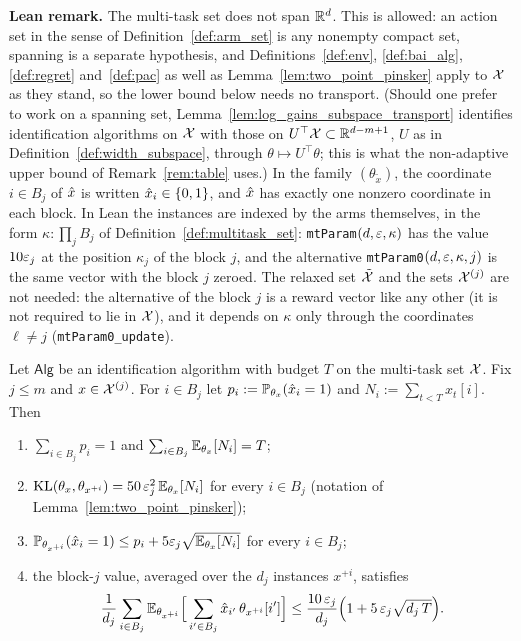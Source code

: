 \textbf{Lean remark.} The multi-task set does not span $\mathbb{R}^d$. This is allowed: an action
set in the sense of Definition~\ref{def:arm_set} is any nonempty compact set, spanning is a
separate hypothesis, and Definitions~\ref{def:env}, \ref{def:bai_alg}, \ref{def:regret}
and~\ref{def:pac} as well as Lemma~\ref{lem:two_point_pinsker} apply to $\mathcal{X}$ as they stand,
so the lower bound below needs no transport. (Should one prefer to work on a spanning set,
Lemma~\ref{lem:log_gains_subspace_transport} identifies identification algorithms on $\mathcal{X}$
with those on $U^\top\mathcal{X} \subset \mathbb{R}^{d-m+1}$, $U$ as in Definition~\ref{def:width_subspace},
through $\theta \mapsto U^\top\theta$; this is what the non-adaptive upper bound of
Remark~\ref{rem:table} uses.)
In the family $(\theta_{\tilde x})$, the coordinate $i \in B_j$ of $\hat{x}$ is written
$\hat{x}_i \in \{0,1\}$, and $\hat{x}$ has exactly one nonzero coordinate in each block.
In Lean the instances are indexed by the arms themselves, in the form
$\kappa : \prod_j B_j$ of Definition~\ref{def:multitask_set}: \texttt{mtParam}$(d,\varepsilon,\kappa)$
has the value $10\varepsilon_j$ at the position $\kappa_j$ of the block $j$, and the alternative
\texttt{mtParam0}$(d,\varepsilon,\kappa,j)$ is the same vector with the block $j$ zeroed. The relaxed set
$\tilde{\mathcal{X}}$ and the sets $\mathcal{X}^{(j)}$ are not needed: the alternative of the block $j$ is a
reward vector like any other (it is not required to lie in $\mathcal{X}$), and it depends on $\kappa$
only through the coordinates $\ell \ne j$ (\texttt{mtParam0\_update}).

\begin{lemma}\label{lem:multitask_block_average}
Let $\mathsf{Alg}$ be an identification algorithm with budget $T$ on the multi-task set
$\mathcal{X}$. Fix $j \le m$ and $x \in \mathcal{X}^{(j)}$. For $i \in B_j$ let
$p_i := \mathbb{P}_{\theta_x}(\hat{x}_i = 1)$ and $N_i := \sum_{t<T}x_t[i]$. Then
\begin{enumerate}
  \item[(i)] $\sum_{i\in B_j}p_i = 1$ and $\sum_{i\in B_j}\mathbb{E}_{\theta_x}[N_i] = T$;
  \item[(ii)] $\mathrm{KL}(\theta_x, \theta_{x^{+i}}) = 50\,\varepsilon_j^2\,\mathbb{E}_{\theta_x}[N_i]$ for every
        $i \in B_j$ (notation of Lemma~\ref{lem:two_point_pinsker});
  \item[(iii)] $\mathbb{P}_{\theta_{x^{+i}}}(\hat{x}_i = 1) \le p_i + 5\varepsilon_j\sqrt{\mathbb{E}_{\theta_x}[N_i]}$
        for every $i \in B_j$;
  \item[(iv)] the block-$j$ value, averaged over the $d_j$ instances $x^{+i}$, satisfies
        \[
          \frac{1}{d_j}\sum_{i\in B_j}\mathbb{E}_{\theta_{x^{+i}}}\Big[\sum_{i'\in B_j}\hat{x}_{i'}\,\theta_{x^{+i}}[i']\Big]
          \le \frac{10\,\varepsilon_j}{d_j}\Big(1 + 5\,\varepsilon_j\sqrt{d_j\,T}\Big).
        \]
\end{enumerate}
\end{lemma}

